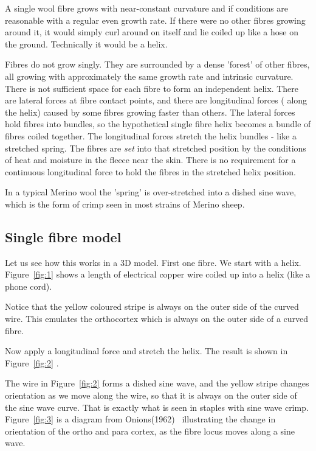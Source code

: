 \documentclass[titlepage,10pt]{article}  %
\begin{document}
A single wool fibre grows with near-constant curvature and if conditions are reasonable with a regular even growth rate. If there were no other fibres growing around it, it would simply curl around on itself and lie coiled up like a hose on the ground. Technically it would be a helix. 

Fibres do not grow singly. They are surrounded by a dense 'forest' of other fibres, all growing with approximately the same growth rate and intrinsic curvature. There is not sufficient space for each fibre to form an independent helix. There are lateral forces at fibre contact points, and there are longitudinal forces ( along the helix) caused by some fibres growing faster than  others. The lateral forces hold fibres into bundles, so the hypothetical single fibre helix becomes a bundle of fibres coiled together. The longitudinal forces stretch the helix bundles - like a stretched spring. The fibres are {\em set} into that stretched position by the conditions of heat and moisture in the fleece near the skin. There is no requirement for a continuous longitudinal force to hold the fibres in the stretched helix position. 

In a typical Merino wool the 'spring' is over-stretched into a dished sine wave, which is the form of crimp seen in most strains of Merino sheep.


\subsection{Single fibre model}
Let us see how this works in a 3D model. First one fibre. We start with a helix. Figure~\ref{fig:1}  shows a length of electrical copper wire coiled up into a helix (like a phone cord). 



Notice that the yellow coloured stripe is always on the outer side of the curved wire. This emulates the orthocortex which is always on the outer side of a curved fibre.

Now apply a longitudinal force and stretch the helix. The result is shown in Figure~\ref{fig:2} .


 
The wire in Figure~\ref{fig:2} forms a dished sine wave, and the yellow stripe  changes orientation as we move along the wire, so that it is always on the outer side of the sine wave curve. That is exactly what is seen in staples with sine wave crimp. Figure~\ref{fig:3} is a diagram from Onions(1962)~\cite{onio:62}  illustrating the change in orientation of the ortho and para cortex, as the fibre locus moves along a sine wave.
\end{document}
